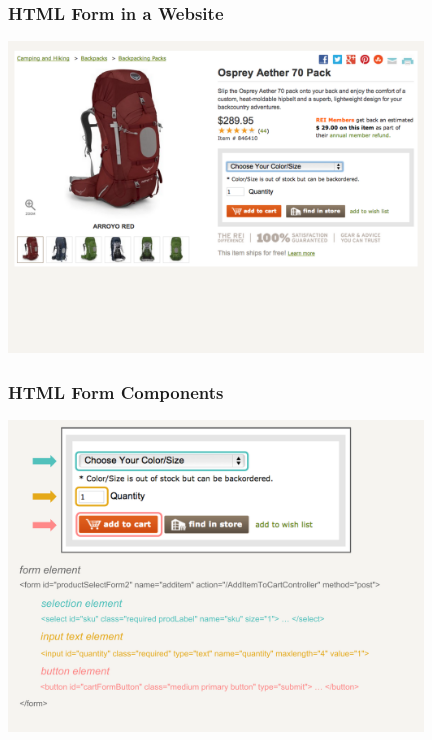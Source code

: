 \documentclass{beamer}\usepackage[]{graphicx}\usepackage[]{color}
\begin{document}
\begin{frame}[fragile]
\frametitle{HTML Form in a Website}

\begin{center}
\includegraphics[width=11cm]{images/backpack_form.pdf}
\end{center}

\end{frame}


\begin{frame}[fragile]
\frametitle{HTML Form Components}

\begin{center}
\includegraphics[width=11cm]{images/product_select.pdf}
\end{center}

\end{frame}

\end{document}
